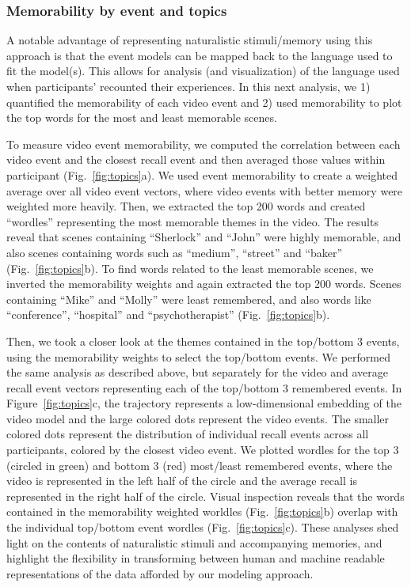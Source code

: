 \documentclass{article}
\begin{document}
\subsubsection{Memorability by event and topics}
A notable advantage of representing naturalistic stimuli/memory using this approach is that the event models can be mapped back to the language used to fit the model(s).  This allows for analysis (and visualization) of the language used when participants' recounted their experiences.  In this next analysis, we 1) quantified the memorability of each video event and 2) used memorability to plot the top words for the most and least memorable scenes.

To measure video event memorability, we computed the correlation between each video event and the closest recall event and then averaged those values within participant (Fig.~\ref{fig:topics}a). We used event memorability to create a weighted average over all video event vectors, where video events with better memory were weighted more heavily. Then, we extracted the top 200 words and created ``wordles'' representing the most memorable themes in the video. The results reveal that scenes containing ``Sherlock'' and ``John'' were highly memorable, and also scenes containing words such as ``medium'', ``street'' and ``baker'' (Fig.~\ref{fig:topics}b). To find words related to the least memorable scenes, we inverted the memorability weights and again extracted the top 200 words.  Scenes containing ``Mike'' and ``Molly'' were least remembered, and also words like ``conference'', ``hospital'' and ``psychotherapist'' (Fig.~\ref{fig:topics}b).

Then, we took a closer look at the themes contained in the top/bottom 3 events, using the memorability weights to select the top/bottom events. We performed the same analysis as described above, but separately for the video and average recall event vectors representing each of the top/bottom 3 remembered events. In Figure~\ref{fig:topics}c, the trajectory represents a low-dimensional embedding of the video model and the large colored dots represent the video events. The smaller colored dots represent the distribution of individual recall events across all participants, colored by the closest video event. We plotted wordles for the top 3 (circled in green) and bottom 3 (red) most/least remembered events, where the video is represented in the left half of the circle and the average recall is represented in the right half of the circle. Visual inspection reveals that the words contained in the memorability weighted worldles (Fig.~\ref{fig:topics}b) overlap with the individual top/bottom event wordles (Fig.~\ref{fig:topics}c). These analyses shed light on the contents of naturalistic stimuli and accompanying memories, and highlight the flexibility in transforming between human and machine readable representations of the data afforded by our modeling approach.
\end{document}
